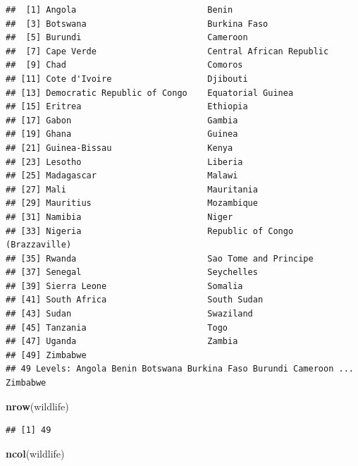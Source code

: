 \documentclass[
  12pt,
]{article}
\newenvironment{Shaded}{\begin{snugshade}}{\end{snugshade}}
\newcommand{\KeywordTok}[1]{\textcolor[rgb]{0.13,0.29,0.53}{\textbf{#1}}}
\newcommand{\NormalTok}[1]{#1}
\begin{document}
\begin{verbatim}
##  [1] Angola                          Benin                          
##  [3] Botswana                        Burkina Faso                   
##  [5] Burundi                         Cameroon                       
##  [7] Cape Verde                      Central African Republic       
##  [9] Chad                            Comoros                        
## [11] Cote d'Ivoire                   Djibouti                       
## [13] Democratic Republic of Congo    Equatorial Guinea              
## [15] Eritrea                         Ethiopia                       
## [17] Gabon                           Gambia                         
## [19] Ghana                           Guinea                         
## [21] Guinea-Bissau                   Kenya                          
## [23] Lesotho                         Liberia                        
## [25] Madagascar                      Malawi                         
## [27] Mali                            Mauritania                     
## [29] Mauritius                       Mozambique                     
## [31] Namibia                         Niger                          
## [33] Nigeria                         Republic of Congo (Brazzaville)
## [35] Rwanda                          Sao Tome and Principe          
## [37] Senegal                         Seychelles                     
## [39] Sierra Leone                    Somalia                        
## [41] South Africa                    South Sudan                    
## [43] Sudan                           Swaziland                      
## [45] Tanzania                        Togo                           
## [47] Uganda                          Zambia                         
## [49] Zimbabwe                       
## 49 Levels: Angola Benin Botswana Burkina Faso Burundi Cameroon ... Zimbabwe
\end{verbatim}

\begin{Shaded}
\begin{Highlighting}[]
\KeywordTok{nrow}\NormalTok{(wildlife)}
\end{Highlighting}
\end{Shaded}

\begin{verbatim}
## [1] 49
\end{verbatim}

\begin{Shaded}
\begin{Highlighting}[]
\KeywordTok{ncol}\NormalTok{(wildlife)}
\end{Highlighting}
\end{Shaded}
\end{document}
